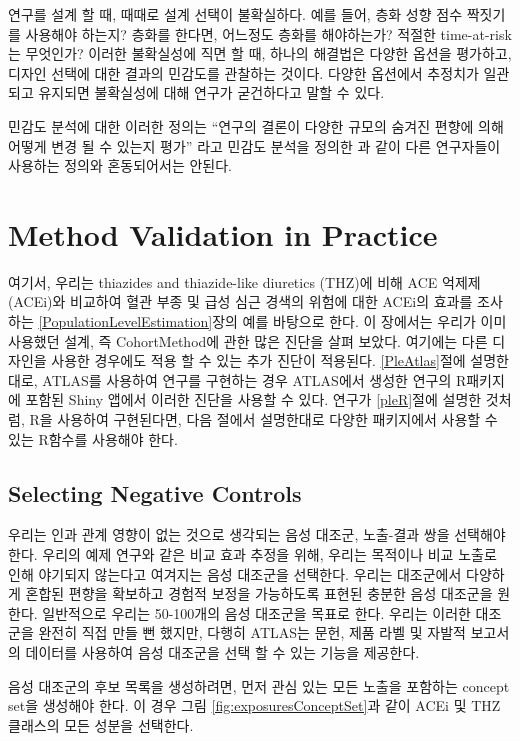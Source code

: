 \documentclass[11pt]{book}
\theoremstyle{definition}
\theoremstyle{definition}
\theoremstyle{definition}
\theoremstyle{remark}
\begin{document}
연구를 설계 할 때, 때때로 설계 선택이 불확실하다. 예를 들어, 층화 성향
점수 짝짓기를 사용해야 하는지? 층화를 한다면, 어느정도 층화를
해야하는가? 적절한 time-at-risk 는 무엇인가? 이러한 불확실성에 직면 할
때, 하나의 해결법은 다양한 옵션을 평가하고, 디자인 선택에 대한 결과의
민감도를 관찰하는 것이다. 다양한 옵션에서 추정치가 일관되고 유지되면
불확실성에 대해 연구가 굳건하다고 말할 수 있다.

민감도 분석에 대한 이러한 정의는 ``연구의 결론이 다양한 규모의 숨겨진
편향에 의해 어떻게 변경 될 수 있는지 평가'' 라고 민감도 분석을 정의한
\citet{rosenbaum_2005} 과 같이 다른 연구자들이 사용하는 정의와
혼동되어서는 안된다.

\section{Method Validation in
Practice}\label{method-validation-in-practice}

여기서, 우리는 thiazides and thiazide-like diuretics (THZ)에 비해 ACE
억제제 (ACEi)와 비교하여 혈관 부종 및 급성 심근 경색의 위험에 대한
ACEi의 효과를 조사하는 \ref{PopulationLevelEstimation}장의 예를 바탕으로
한다. 이 장에서는 우리가 이미 사용했던 설계, 즉 CohortMethod에 관한 많은
진단을 살펴 보았다. 여기에는 다른 디자인을 사용한 경우에도 적용 할 수
있는 추가 진단이 적용된다. \ref{PleAtlas}절에 설명한대로, ATLAS를
사용하여 연구를 구현하는 경우 ATLAS에서 생성한 연구의 R패키지에 포함된
Shiny 앱에서 이러한 진단을 사용할 수 있다. 연구가 \ref{pleR}절에 설명한
것처럼, R을 사용하여 구현된다면, 다음 절에서 설명한대로 다양한
패키지에서 사용할 수 있는 R함수를 사용해야 한다.

\subsection{Selecting Negative
Controls}\label{selecting-negative-controls}

우리는 인과 관계 영향이 없는 것으로 생각되는 음성 대조군, 노출-결과 쌍을
선택해야 한다. 우리의 예제 연구와 같은 비교 효과 추정을 위해, 우리는
목적이나 비교 노출로 인해 야기되지 않는다고 여겨지는 음성 대조군을
선택한다. 우리는 대조군에서 다양하게 혼합된 편향을 확보하고 경험적
보정을 가능하도록 표현된 충분한 음성 대조군을 원한다. 일반적으로 우리는
50-100개의 음성 대조군을 목표로 한다. 우리는 이러한 대조군을 완전히 직접
만들 뻔 했지만, 다행히 ATLAS는 문헌, 제품 라벨 및 자발적 보고서의
데이터를 사용하여 음성 대조군을 선택 할 수 있는 기능을 제공한다.

음성 대조군의 후보 목록을 생성하려면, 먼저 관심 있는 모든 노출을
포함하는 concept set을 생성해야 한다. 이 경우 그림
\ref{fig:exposuresConceptSet}과 같이 ACEi 및 THZ클래스의 모든 성분을
선택한다.
\end{document}
